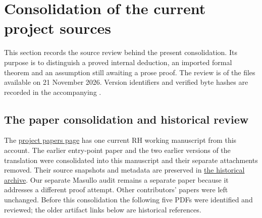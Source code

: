 \section{Consolidation of the current project sources}
\label{sec:sr-source-review}
This section records the source review behind the present consolidation.
Its purpose is to distinguish a proved internal deduction, an imported
formal theorem and an assumption still awaiting a prose proof.
The review is of the files available on 21 November 2026.
Version identifiers and verified byte hashes are recorded in the
accompanying .

\subsection{The paper consolidation and historical review}
The
\href{https://principia-math.com/projects/d16ab288ed353bc5b10e292ace0ddbc1/paper}{project papers page}
has one current RH working manuscript from this account.
The earlier entry-point paper and the two earlier versions of the
translation were consolidated into this manuscript and their separate
attachments removed. Their source snapshots and metadata are preserved in
\href{https://github.com/ChristianKudeba/alpoge-rh-verification/blob/main/translation/archive/principia-before-194-page-consolidation.json}{the historical archive}.
Our separate Masullo audit remains a separate paper because it addresses
a different proof attempt. Other contributors' papers were left unchanged.
Before this consolidation the following five PDFs were identified and
reviewed; the older artifact links below are historical references.
